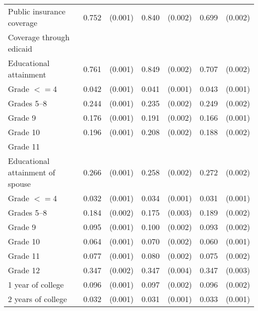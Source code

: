 \begin{tabular}{lcccccc}
 \hspace{0.3cm}  Public insurance coverage   & 0.752 & (0.001)  & 0.840 & (0.002)  & 0.699 & (0.002)  \\
 \hspace{0.3cm}  Coverage through edicaid   & & &  \\
 Educational attainment   & 0.761 & (0.001)  & 0.849 & (0.002)  & 0.707 & (0.002)  \\
 \hspace{0.3cm} Grade $<=$4   & 0.042 & (0.001)  & 0.041 & (0.001)  & 0.043 & (0.001)  \\
 \hspace{0.3cm}  Grades 5--8   & 0.244 & (0.001)  & 0.235 & (0.002)  & 0.249 & (0.002)  \\
 \hspace{0.3cm} Grade 9   & 0.176 & (0.001)  & 0.191 & (0.002)  & 0.166 & (0.001)  \\
 \hspace{0.3cm} Grade 10   & 0.196 & (0.001)  & 0.208 & (0.002)  & 0.188 & (0.002)  \\
 \hspace{0.3cm} Grade 11   & & &  \\
 Educational attainment of spouse   & 0.266 & (0.001)  & 0.258 & (0.002)  & 0.272 & (0.002)  \\
 \hspace{0.3cm} Grade $<=$4   & 0.032 & (0.001)  & 0.034 & (0.001)  & 0.031 & (0.001)  \\
 \hspace{0.3cm}  Grades 5--8   & 0.184 & (0.002)  & 0.175 & (0.003)  & 0.189 & (0.002)  \\
 \hspace{0.3cm} Grade 9   & 0.095 & (0.001)  & 0.100 & (0.002)  & 0.093 & (0.002)  \\
 \hspace{0.3cm} Grade 10   & 0.064 & (0.001)  & 0.070 & (0.002)  & 0.060 & (0.001)  \\
 \hspace{0.3cm} Grade 11   & 0.077 & (0.001)  & 0.080 & (0.002)  & 0.075 & (0.002)  \\
 \hspace{0.3cm} Grade 12   & 0.347 & (0.002)  & 0.347 & (0.004)  & 0.347 & (0.003)  \\
 \hspace{0.3cm} 1 year of college   & 0.096 & (0.001)  & 0.097 & (0.002)  & 0.096 & (0.002)  \\
 \hspace{0.3cm} 2 years of college   & 0.032 & (0.001)  & 0.031 & (0.001)  & 0.033 & (0.001)  \\

\end{tabular}
